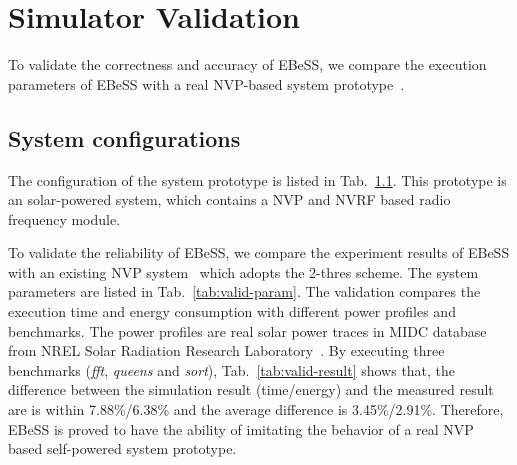 \section{Simulator Validation}	\label{sec:valid}
%
To validate the correctness and accuracy of EBeSS, we compare the execution parameters of EBeSS with a real NVP-based system prototype~\cite{}. 

\subsection{System configurations}
The configuration of the system prototype is listed in Tab.~\ref{}. 
This prototype is an solar-powered system, which contains a NVP and NVRF based radio frequency module.








To validate the reliability of EBeSS, we compare the experiment results of EBeSS with an existing NVP system~\cite{Liu2015Ambient} which adopts the 2-thres scheme. 
The system parameters are listed in Tab.~\ref{tab:valid-param}.
The validation compares the execution time and energy consumption with different power profiles and benchmarks.
The power profiles are real solar power traces in MIDC database from NREL Solar Radiation Research Laboratory~\cite{midc2015solar}.
By executing three benchmarks (\emph{fft}, \emph{queens} and \emph{sort}), Tab.~\ref{tab:valid-result} shows that, the difference between the simulation result (time/energy) and the measured result are is within 7.88\%/6.38\% and the average difference is 3.45\%/2.91\%.
Therefore, EBeSS is proved to have the ability of imitating the behavior of a real NVP based self-powered system prototype.


